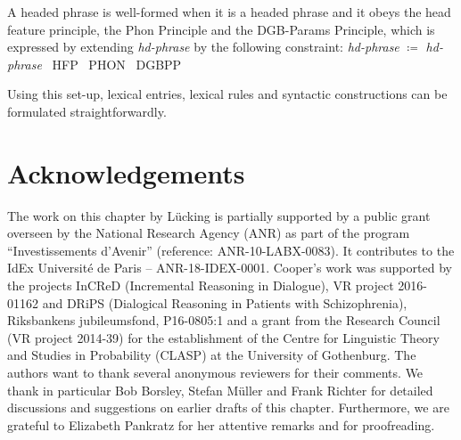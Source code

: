 \documentclass[output=paper
 	        ,biblatex
                ,babelshorthands
                ,newtxmath
                ,draftmode
                ,colorlinks, citecolor=brown
]{langscibook}
\begin{document}
A headed phrase is well-formed when it is a headed phrase and it obeys the head feature principle, the Phon Principle and the DGB-Params Principle, which is expressed by extending \emph{hd-phrase} by the following constraint:
%
\ea \label{ex:hd-phrase}
\emph{hd-phrase} $\coloneqq$ 
\emph{hd-phrase} \ttrmerge\ {HFP} \ttrmerge\  {PHON} \ttrmerge\ {DGBPP}
\z

\noindent
Using this set-up, lexical entries, lexical rules and syntactic constructions can be formulated straightforwardly.%


 
\section*{Acknowledgements}


The work on this chapter by Lücking is partially supported by a public grant overseen by the  National Research Agency (ANR) as part of the program ``Investissements d'Avenir'' (reference: ANR-10-LABX-0083). It contributes to the IdEx Université de Paris -- ANR-18-IDEX-0001. Cooper's work was supported by the projects InCReD (Incremental Reasoning in Dialogue), VR project 2016-01162 and DRiPS (Dialogical Reasoning in Patients with Schizophrenia), Riksbankens jubileumsfond, P16-0805:1 and a grant from the  Research Council (VR project 2014-39) for the establishment of the Centre for Linguistic Theory and Studies in Probability (CLASP) at the University of Gothenburg. The authors want to thank several anonymous reviewers for their comments. We thank in particular Bob Borsley, Stefan Müller and Frank Richter for detailed discussions and suggestions on earlier drafts of this chapter. Furthermore, we are grateful to Elizabeth Pankratz for her attentive remarks and for proofreading.


{\sloppy
\printbibliography[heading=subbibliography,notkeyword=this]
}
\end{document}
